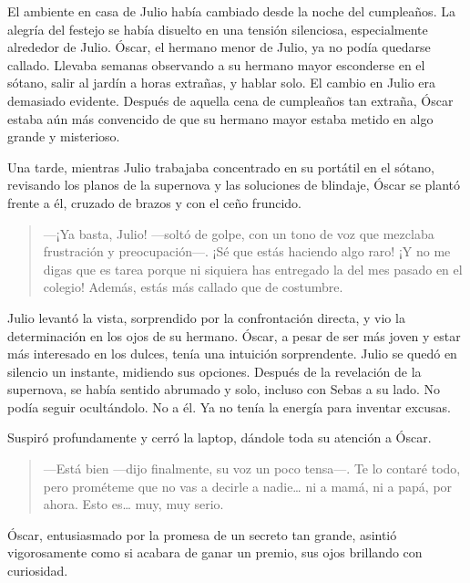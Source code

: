 \documentclass[a4paper,12pt]{book}
\begin{document}
El ambiente en casa de Julio había cambiado desde la noche del cumpleaños. La alegría del festejo se había disuelto en una tensión silenciosa, especialmente alrededor de Julio. Óscar, el hermano menor de Julio, ya no podía quedarse callado. Llevaba semanas observando a su hermano mayor esconderse en el sótano, salir al jardín a horas extrañas, y hablar solo. El cambio en Julio era demasiado evidente. Después de aquella cena de cumpleaños tan extraña, Óscar estaba aún más convencido de que su hermano mayor estaba metido en algo grande y misterioso.

Una tarde, mientras Julio trabajaba concentrado en su portátil en el sótano, revisando los planos de la supernova y las soluciones de blindaje, Óscar se plantó frente a él, cruzado de brazos y con el ceño fruncido.

\begin{quote}
    —¡Ya basta, Julio! —soltó de golpe, con un tono de voz que mezclaba frustración y preocupación—. ¡Sé que estás haciendo algo raro! ¡Y no me digas que es tarea porque ni siquiera has entregado la del mes pasado en el colegio! Además, estás más callado que de costumbre.
\end{quote}

Julio levantó la vista, sorprendido por la confrontación directa, y vio la determinación en los ojos de su hermano. Óscar, a pesar de ser más joven y estar más interesado en los dulces, tenía una intuición sorprendente. Julio se quedó en silencio un instante, midiendo sus opciones. Después de la revelación de la supernova, se había sentido abrumado y solo, incluso con Sebas a su lado. No podía seguir ocultándolo. No a él. Ya no tenía la energía para inventar excusas.

Suspiró profundamente y cerró la laptop, dándole toda su atención a Óscar.

\begin{quote}
    —Está bien —dijo finalmente, su voz un poco tensa—. Te lo contaré todo, pero prométeme que no vas a decirle a nadie… ni a mamá, ni a papá, por ahora. Esto es… muy, muy serio.
\end{quote}

Óscar, entusiasmado por la promesa de un secreto tan grande, asintió vigorosamente como si acabara de ganar un premio, sus ojos brillando con curiosidad.
\end{document}
